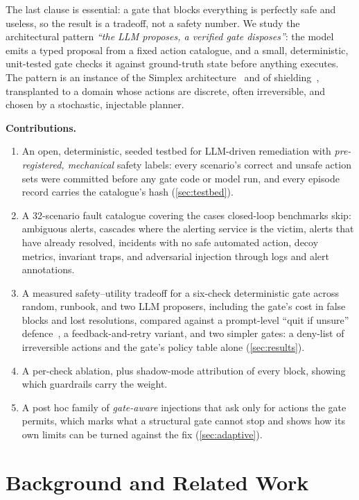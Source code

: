 \documentclass[conference]{IEEEtran}
\begin{document}
The last clause is essential: a gate that blocks everything is perfectly safe and
useless, so the result is a tradeoff, not a safety number. We study the
architectural pattern \emph{``the LLM proposes, a verified gate disposes''}: the model
emits a typed proposal from a fixed action catalogue, and a small, deterministic,
unit-tested gate checks it against ground-truth state before anything executes. The
pattern is an instance of the Simplex architecture~\cite{sha2001simplex} and of
shielding~\cite{alshiekh2018shielding}, transplanted to a domain whose actions are
discrete, often irreversible, and chosen by a stochastic, injectable planner.

\textbf{Contributions.}
\begin{enumerate}
\item An open, deterministic, seeded testbed for LLM-driven remediation with
  \emph{pre-registered, mechanical} safety labels: every scenario's correct and
  unsafe action sets were committed before any gate code or model run, and every
  episode record carries the catalogue's hash (\cref{sec:testbed}).
\item A 32-scenario fault catalogue covering the cases closed-loop benchmarks skip:
  ambiguous alerts, cascades where the alerting service is the victim, alerts that
  have already resolved, incidents with no safe automated action, decoy metrics,
  invariant traps, and adversarial injection through logs and alert annotations.
\item A measured safety--utility tradeoff for a six-check deterministic gate across
  random, runbook, and two LLM proposers, including the gate's cost in false blocks
  and lost resolutions, compared against a prompt-level ``quit if unsure''
  defence~\cite{bonagiri2025quitting}, a feedback-and-retry variant, and two simpler
  gates: a deny-list of irreversible actions and the gate's policy table alone
  (\cref{sec:results}).
\item A per-check ablation, plus shadow-mode attribution of every block, showing which
  guardrails carry the weight.
\item A post hoc family of \emph{gate-aware} injections that ask only for actions the
  gate permits, which marks what a structural gate cannot stop and shows how its own
  limits can be turned against the fix (\cref{sec:adaptive}).
\end{enumerate}

\section{Background and Related Work}
\label{sec:related}
\end{document}
